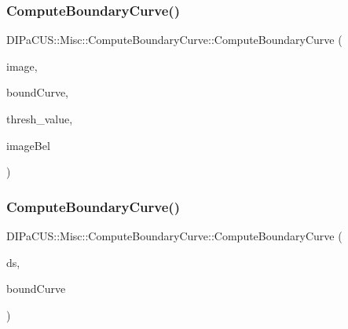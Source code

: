 \mbox{\label{structDIPaCUS_1_1Misc_1_1ComputeBoundaryCurve_a9b48adce328d2cbfeac5917407d3bc7d}} 
\subsubsection{\texorpdfstring{Compute\+Boundary\+Curve()}{ComputeBoundaryCurve()}\hspace{0.1cm}{\footnotesize\ttfamily [2/3]}}
{\footnotesize\ttfamily D\+I\+Pa\+C\+U\+S\+::\+Misc\+::\+Compute\+Boundary\+Curve\+::\+Compute\+Boundary\+Curve (\begin{DoxyParamCaption}\item[{const \hyperlink{structDIPaCUS_1_1Misc_1_1ComputeBoundaryCurve_a67511f091a6fb85b38f29a4df3f480dd}{Image2D} \&}]{image,  }\item[{\hyperlink{structDIPaCUS_1_1Misc_1_1ComputeBoundaryCurve_ac3d7adcd3d9b37d2166c65346e0916d2}{Curve} \&}]{bound\+Curve,  }\item[{\hyperlink{structDIPaCUS_1_1Misc_1_1ComputeBoundaryCurve_a31db1fa680bce958cccb412fac81fe14}{Threshold\+Value}}]{thresh\+\_\+value,  }\item[{\hyperlink{structDIPaCUS_1_1Misc_1_1ComputeBoundaryCurve_affd97ae2b7fea729fca28c9a4bb16fd5}{S\+Cell}}]{image\+Bel }\end{DoxyParamCaption})}

\mbox{\label{structDIPaCUS_1_1Misc_1_1ComputeBoundaryCurve_ad21bd2d68bfa7ac20c8ada1ed79ee2c6}} 
\subsubsection{\texorpdfstring{Compute\+Boundary\+Curve()}{ComputeBoundaryCurve()}\hspace{0.1cm}{\footnotesize\ttfamily [3/3]}}
{\footnotesize\ttfamily D\+I\+Pa\+C\+U\+S\+::\+Misc\+::\+Compute\+Boundary\+Curve\+::\+Compute\+Boundary\+Curve (\begin{DoxyParamCaption}\item[{const \hyperlink{structDIPaCUS_1_1Misc_1_1ComputeBoundaryCurve_af25e121edbd5e213e20da7abcc4401cc}{Digital\+Set} \&}]{ds,  }\item[{\hyperlink{structDIPaCUS_1_1Misc_1_1ComputeBoundaryCurve_ac3d7adcd3d9b37d2166c65346e0916d2}{Curve} \&}]{bound\+Curve }\end{DoxyParamCaption})}



